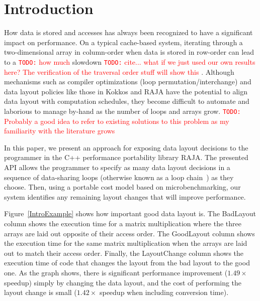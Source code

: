 \documentclass[sigconf, table]{acmart}
\newcommand{\todo}[1]{{\textcolor{red}{{\tt{TODO:}}\,\,#1 }}}
\begin{document}
\maketitle

\section{Introduction}

How data is stored and accesses has always been recognized to have a significant impact on performance. 
On a typical cache-based system, iterating through a two-dimensional array in column-order when data is 
stored in row-order can lead to a \todo{how much} slowdown 
\todo{cite... what if we just used our own results here? The verification of the traversal order stuff will show this}.
Although mechanisms such as compiler optimizations (loop permutation/interchange) 
and data layout policies like those in Kokkos \cite{edwards2014kokkos} and RAJA \cite{hornung2014RAJA} have the potential to align data layout with computation schedules, they become difficult to automate and laborious to manage by-hand as the number of loops and arrays grow.
\todo{Probably a good idea to refer to existing solutions to this problem as my familiarity with the literature grows}

In this paper, we present an approach for exposing data layout decisions to the programmer in the C++ performance portability library RAJA.
The presented API allows the programmer to specify as many data layout decisions in a sequence of data-sharing loops (otherwise known as a loop chain~\cite{krieger2013loop}) as they choose.
Then, using a portable cost model based on microbenchmarking, our system identifies any remaining layout changes that will improve performance.  

Figure~\ref{IntroExample} shows how important good data layout is. 
The BadLayout column shows the execution time for a matrix multiplication where the three arrays are laid out opposite of their access order. 
The GoodLayout column shows the execution time for the same matrix multiplication when the arrays are laid out to match their access order.
Finally, the LayoutChange column shows the execution time of code that changes the layout from the bad layout to the good one.
As the graph shows, there is significant performance improvement ($1.49\times$ speedup) simply by changing the data layout, and the cost of performing the layout change is small ($1.42\times$ speedup when including conversion time). 
\end{document}
